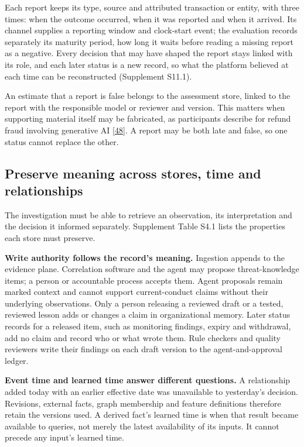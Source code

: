 \documentclass[acmlarge,nonacm]{acmart}
\begin{document}
Each report keeps its type, source and attributed transaction or entity,
with three times: when the outcome occurred, when it was reported and
when it arrived. Its channel supplies a reporting window and clock-start
event; the evaluation records separately its maturity period, how long
it waits before reading a missing report as a negative. Every decision
that may have shaped the report stays linked with its role, and each
later status is a new record, so what the platform believed at each time
can be reconstructed (Supplement S11.1).

An estimate that a report is false belongs to the assessment store,
linked to the report with the responsible model or reviewer and version.
This matters when supporting material itself may be fabricated, as
participants describe for refund fraud involving generative AI
{[}\protect\hyperlink{ref-Zhang2026Refund}{48}{]}. A report may be both
late and false, so one status cannot replace the other.

\hypertarget{preserve-meaning-across-stores-time-and-relationships}{%
\subsection{Preserve meaning across stores, time and
relationships}\label{preserve-meaning-across-stores-time-and-relationships}}

The investigation must be able to retrieve an observation, its
interpretation and the decision it informed separately. Supplement Table
S4.1 lists the properties each store must preserve.

\textbf{Write authority follows the record's meaning.} Ingestion appends
to the evidence plane. Correlation software and the agent may propose
threat-knowledge items; a person or accountable process accepts them.
Agent proposals remain marked context and cannot support current-conduct
claims without their underlying observations. Only a person releasing a
reviewed draft or a tested, reviewed lesson adds or changes a claim in
organizational memory. Later status records for a released item, such as
monitoring findings, expiry and withdrawal, add no claim and record who
or what wrote them. Rule checkers and quality reviewers write their
findings on each draft version to the agent-and-approval ledger.

\textbf{Event time and learned time answer different questions.} A
relationship added today with an earlier effective date was unavailable
to yesterday's decision. Revisions, external facts, graph membership and
feature definitions therefore retain the versions used. A derived fact's
learned time is when that result became available to queries, not merely
the latest availability of its inputs. It cannot precede any input's
learned time.
\end{document}
